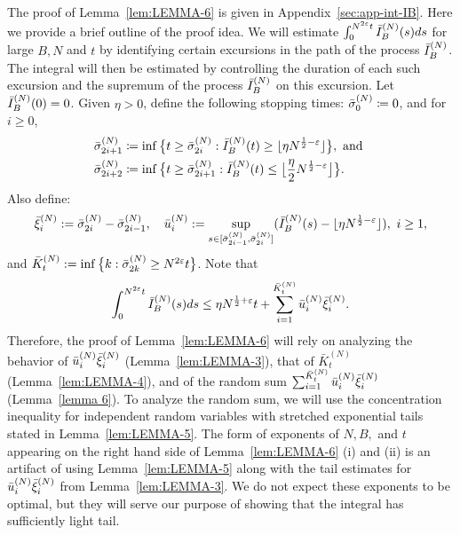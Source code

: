 \documentclass[11pt, reqno]{article}
\numberwithin{equation}{section}
\numberwithin{theorem}{section}
\newcommand\blue[1]{#1}
\begin{document}
The proof of Lemma~\ref{lem:LEMMA-6} is given in Appendix~\ref{sec:app-int-IB}.
Here we provide a brief outline of the proof idea.
We will estimate $\int_0^{N^{2\varepsilon}t}\Bar{I}_B^{(N)}(s)ds$ for large $B,N$ and $t$ by identifying certain excursions in the path of the process $\Bar{I}^{(N)}_B$. The integral will then be estimated by controlling the duration of each such excursion and the supremum of the process $\Bar{I}^{(N)}_B$ on this excursion.
Let $\Bar{I}^{(N)}_B(0)=0$. Given $\eta>0$, define the following stopping times: $\Bar{\sigma}^{(N)}_0\coloneqq0$, and for $i\geq 0$,
\begin{align*}
    \Bar{\sigma}^{(N)}_{2i+1} &\coloneqq\inf \big\{t\geq \Bar{\sigma}^{(N)}_{2i}: \Bar{I}^{(N)}_B(t)\geq \lfloor \eta N^{\frac{1}{2}-\varepsilon}\rfloor\big\},\text{ and }\\
    \Bar{\sigma}^{(N)}_{2i+2} &\coloneqq\inf \big\{t\geq \Bar{\sigma}^{(N)}_{2i+1}: \Bar{I}^{(N)}_B(t)\leq \big\lfloor \frac{\eta}{2} N^{\frac{1}{2}-\varepsilon} \big\rfloor\big\}.
\end{align*}
Also define:
    $$\Bar{\xi}^{(N)}_i :=\Bar{\sigma}^{(N)}_{2i}-\Bar{\sigma}^{(N)}_{2i-1}, \ \ \
    \Bar{u}^{(N)}_i :=\sup_{s\in[\Bar{\sigma}^{(N)}_{2i-1},\Bar{\sigma}^{(N)}_{2i}]}(\Bar{I}_B^{(N)}(s)-\lfloor \eta N^{\frac{1}{2}-\varepsilon}\rfloor), \ i\geq 1,
    $$
    and
    $\bar{K}^{(N)}_t :=\inf\big\{k:\Bar{\sigma}^{(N)}_{2k}\geq N^{2\varepsilon}t\big\}$.
 Note that 
 \begin{equation}\label{eq:app:int-IB}
      \int_0^{N^{2\varepsilon}t}\Bar{I}_B^{(N)}(s)ds \le \eta N^{\frac{1}{2}+\varepsilon} t+ \sum_{i=1}^{\bar{K}^{(N)}_{t}}\Bar{u}^{(N)}_i\Bar{\xi}^{(N)}_i.
 \end{equation}
Therefore, the proof of Lemma~\ref{lem:LEMMA-6} will rely on analyzing the behavior of $\Bar{u}^{(N)}_i\Bar{\xi}^{(N)}_i$ (Lemma~\ref{lem:LEMMA-3}), that of $\bar{K}^{(N)}_{t}$ (Lemma~\ref{lem:LEMMA-4}), and of the random sum $\sum_{i=1}^{\bar{K}^{(N)}_{t}}\Bar{u}^{(N)}_i\Bar{\xi}^{(N)}_i$ (Lemma~\ref{lemma 6}).
To analyze the random sum, we will use the concentration inequality for independent random variables with stretched exponential tails stated in Lemma~\ref{lem:LEMMA-5}.
\blue{The form of exponents of $N, B,$ and $t$ appearing on the right hand side of Lemma~\ref{lem:LEMMA-6} (i) and (ii) is an artifact of using Lemma~\ref{lem:LEMMA-5} along with the tail estimates for $\Bar{u}^{(N)}_i\Bar{\xi}^{(N)}_i$ from Lemma~\ref{lem:LEMMA-3}. 
We do not expect these exponents to be optimal, but they will serve our purpose of showing that the integral has sufficiently light tail.}
\end{document}
